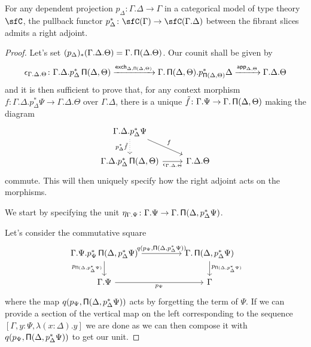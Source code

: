 \begin{lem}\label{radj}
  For any dependent projection $p_\Delta\colon\Gamma.\Delta\rightarrow\Gamma$ in
  a categorical model of type theory $\sfC$, the pullback functor
  $p_\Delta^*\colon\sfC(\Gamma)\rightarrow\sfC(\Gamma.\Delta)$ between the fibrant
  slices admits a right adjoint.
\end{lem}
\begin{proof}

  Let's set $(p_\Delta)_*(\Gamma.\Delta.\Theta)=\Gamma.\operatorname{\mathsf{\Pi}}(\Delta.\Theta)$. Our
  counit shall be given by
  \[\epsilon_{\Gamma.\Delta.\Theta}\colon\Gamma.\Delta.p^*_\Delta\operatorname{\mathsf{\Pi}}(\Delta,\Theta)
  \xrightarrow{\operatorname{\mathsf{exch}}_{\Delta,\operatorname{\mathsf{\Pi}}(\Delta,\Theta)}}\Gamma.\operatorname{\mathsf{\Pi}}(\Delta,\Theta).p^*_{\operatorname{\mathsf{\Pi}}(\Delta,\Theta)}\Delta
  \xrightarrow{\operatorname{\mathsf{app}}_{\Delta,\Theta}}\Gamma.\Delta.\Theta\]
  and it is then sufficient to prove that, for any context morphism
  $f\colon\Gamma.\Delta.p^*_\Delta\Psi\rightarrow\Gamma.\Delta.\Theta$ over
  $\Gamma.\Delta$, there is
  a unique $\tilde{f}\colon\Gamma.\Psi\rightarrow\Gamma.\operatorname{\mathsf{\Pi}}(\Delta,\Theta)$
  making the diagram
  \[\begin{tikzcd}
    {\Gamma.\Delta.p^*_\Delta\Psi} \\
    {\Gamma.\Delta.p^*_\Delta\Pis(\Delta,\Theta)} & {\Gamma.\Delta.\Theta}
    \arrow["f", from=1-1, to=2-2]
    \arrow["{\epsilon_{\Gamma.\Delta.\Theta}}"', from=2-1, to=2-2]
    \arrow["{p^*_\Delta\tilde{f}}"', dotted, from=1-1, to=2-1]
  \end{tikzcd}\]
  commute. This will then uniquely specify how the right adjoint acts on the
  morphisms.

  We start by specifying the unit
  $\eta_{\Gamma.\Psi}\colon\Gamma.\Psi\rightarrow\Gamma.\operatorname{\mathsf{\Pi}}(\Delta,p^*_{\Delta}\Psi)$.

  Let's consider the commutative square
  \[\begin{tikzcd}[column sep=huge]
    {\Gamma.\Psi.p^*_\Psi\Pis(\Delta,p^*_\Delta\Psi)} & {\Gamma.\Pis(\Delta,p^*_\Delta\Psi)} \\
    {\Gamma.\Psi} & \Gamma
    \arrow["{p_{\Pis(\Delta,p^*_\Delta\Psi)}}"', from=1-1, to=2-1]
    \arrow["{p_{\Psi}}"', from=2-1, to=2-2]
    \arrow["{p_{\Pis(\Delta,p^*_\Delta\Psi)}}", from=1-2, to=2-2]
    \arrow["{q(p_\Psi,\Pis(\Delta,p^*_\Delta\Psi))}", from=1-1, to=1-2]
  \end{tikzcd}\]
  where the map $q(p_\Psi,\operatorname{\mathsf{\Pi}}(\Delta,p^*_\Delta\Psi))$ acts by forgetting the
  term of $\Psi$. If we can provide a section of the vertical map on the left
  corresponding to the sequence $[\Gamma,y:\Psi,\lambda(x:\Delta).y]$ we are
  done as we can then compose
  it with $q(p_\Psi,\operatorname{\mathsf{\Pi}}(\Delta,p^*_\Delta\Psi))$ to get our unit.
  

\end{proof}
